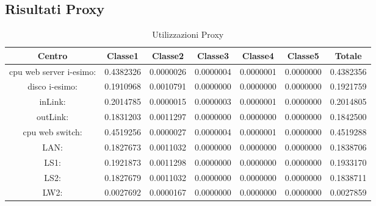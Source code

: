 \subsection{Risultati Proxy}
\begin{table}[H]
\begin{center}\begin{scriptsize}
\begin{tabular}{||c|c|c|c|c|c|c||}
\hline
Centro &Classe1 &Classe2 &Classe3 &Classe4 &Classe5 &Totale\\
\hline
\hline
 cpu web server i-esimo: 	&0.4382326	&0.0000026	&0.0000004	&0.0000001	&0.0000000	&0.4382356\\
\hline
 disco i-esimo: 	&0.1910968	&0.0010791	&0.0000000	&0.0000000	&0.0000000	&0.1921759\\
\hline
 inLink: 	&0.2014785	&0.0000015	&0.0000003	&0.0000001	&0.0000000	&0.2014805\\
\hline
 outLink: 	&0.1831203	&0.0011297	&0.0000000	&0.0000000	&0.0000000	&0.1842500\\
\hline
 cpu web switch: 	&0.4519256	&0.0000027	&0.0000004	&0.0000001	&0.0000000	&0.4519288\\
\hline
 LAN: 	&0.1827673	&0.0011032	&0.0000000	&0.0000000	&0.0000000	&0.1838706\\
\hline
 LS1: 	&0.1921873	&0.0011298	&0.0000000	&0.0000000	&0.0000000	&0.1933170\\
\hline
 LS2:	&0.1827679	&0.0011032	&0.0000000	&0.0000000	&0.0000000	&0.1838711\\
\hline
 LW2: 	&0.0027692	&0.0000167	&0.0000000	&0.0000000	&0.0000000	&0.0027859\\
\hline
\end{tabular}
\end{scriptsize}\end{center}
\caption{Utilizzazioni Proxy}
\label{utilizzazioni}
\end{table}

